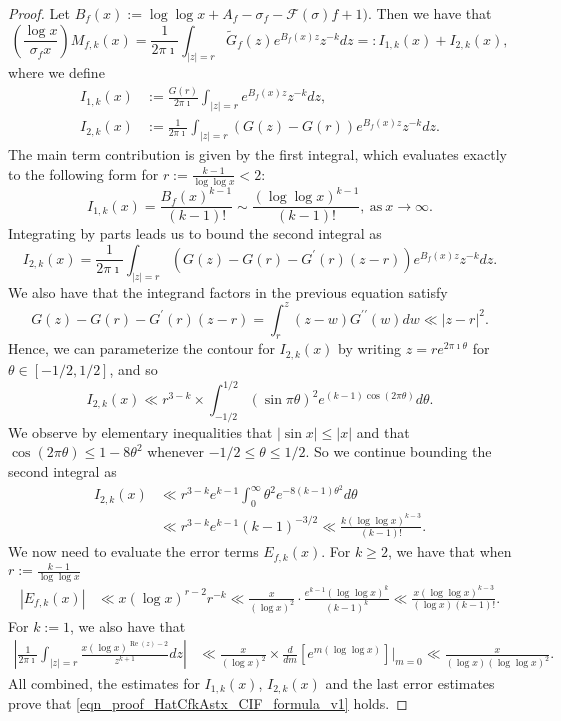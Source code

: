 \documentclass[11pt,reqno,a4letter]{article}
\numberwithin{figure}{section}
\numberwithin{table}{section}
\theoremstyle{plain}
\numberwithin{theorem}{section}
\theoremstyle{definition}
\renewcommand{\Re}{\operatorname{Re}}
\begin{document}
\begin{proof}
Let $B_f(x) := \log\log x + A_f - \sigma_f - \mathcal{F}(\sigma)f+1)$. 
Then we have that 
\[
\left(\frac{\log x}{\sigma_f x}\right) M_{f,k}(x) = \frac{1}{2\pi\imath} \int_{|z|=r} 
     \widetilde{G}_f(z) e^{B_f(x) z} z^{-k} dz =: I_{1,k}(x) + I_{2,k}(x), 
\]
where we define 
\begin{align*}
I_{1,k}(x) & := \frac{G(r)}{2\pi\imath} \int_{|z|=r} e^{B_f(x) z} z^{-k} dz, \\ 
I_{2,k}(x) & := \frac{1}{2\pi\imath} \int_{|z|=r} (G(z)-G(r)) e^{B_f(x) z} z^{-k} dz. 
\end{align*}
The main term contribution is given by the first integral, which evaluates exactly to 
the following form for $r := \frac{k-1}{\log\log x} < 2$: 
\[
I_{1,k}(x) = \frac{B_f(x)^{k-1}}{(k-1)!} \sim \frac{(\log\log x)^{k-1}}{(k-1)!}, 
     \mathrm{\ as\ } x \rightarrow \infty. 
\]
Integrating by parts leads us to bound the second integral as 
\[
I_{2,k}(x) = \frac{1}{2\pi\imath} \int_{|z|=r} (G(z)-G(r) -G^{\prime}(r)(z-r)) e^{B_f(x) z} z^{-k} dz. 
\]
We also have that the integrand factors in the previous equation satisfy 
\[
G(z)-G(r) -G^{\prime}(r)(z-r) = \int_{r}^{z} (z-w) G^{\prime\prime}(w) dw \ll 
     |z-r|^2. 
\]
Hence, we can parameterize the contour for $I_{2,k}(x)$ by writing 
$z = re^{2\pi\imath\theta}$ for $\theta \in [-1/2,1/2]$, and so 
\[
I_{2,k}(x) \ll r^{3-k} \times \int_{-1/2}^{1/2} (\sin \pi\theta)^2 
     e^{(k-1)\cos(2\pi\theta)} d\theta. 
\]
We observe by elementary inequalities that 
$|\sin x| \leq |x|$ and that $\cos(2\pi\theta) \leq 1 - 8\theta^2$ whenever 
$-1/2 \leq \theta \leq 1/2$. So we continue bounding the second integral as 
\begin{align*}
I_{2,k}(x) & \ll r^{3-k} e^{k-1} \int_0^{\infty} \theta^2 e^{-8(k-1)\theta^2} d\theta \\ 
     & \ll 
     r^{3-k} e^{k-1} (k-1)^{-3/2} \ll \frac{k (\log\log x)^{k-3}}{(k-1)!}. 
\end{align*} 
We now need to evaluate the error terms $E_{f,k}(x)$. 
For $k \geq 2$, we have that when $r := \frac{k-1}{\log\log x}$ 
\begin{align*}
|E_{f,k}(x)| & \ll x (\log x)^{r-2} r^{-k} \ll \frac{x}{(\log x)^2} \cdot 
     \frac{e^{k-1} (\log\log x)^{k}}{(k-1)^k} \ll 
     \frac{x (\log\log x)^{k-3}}{(\log x) (k-1)!}. 
\end{align*}
For $k := 1$, we also have that 
\begin{align*}
\left\lvert \frac{1}{2\pi\imath} \int_{|z|=r} \frac{x (\log x)^{\Re(z)-2}}{z^{k+1}} dz \right\rvert & 
     \ll \frac{x}{(\log x)^2} \times \frac{d}{dm}\left[e^{m (\log\log x)}\right]\Bigr\rvert_{m=0} 
     \ll \frac{x}{(\log x) (\log\log x)^2}. 
\end{align*}
All combined, the estimates for $I_{1,k}(x)$, $I_{2,k}(x)$ and the last error estimates 
prove that \eqref{eqn_proof_HatCfkAstx_CIF_formula_v1} holds. 


\end{proof}
\end{document}
